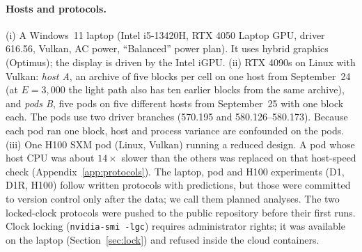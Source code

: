 \paragraph{Hosts and protocols.} (i) A Windows~11 laptop (Intel i5-13420H, RTX 4050 Laptop GPU, driver 616.56, Vulkan, AC power, ``Balanced'' power plan). It uses hybrid graphics (Optimus); the display is driven by the Intel iGPU. (ii) RTX 4090s on Linux with Vulkan: \emph{host A}, an archive of five blocks per cell on one host from September~24 (at $E=3{,}000$ the light path also has ten earlier blocks from the same archive), and \emph{pods B}, five pods on five different hosts from September~25 with one block each. The pods use two driver branches (570.195 and 580.126--580.173). Because each pod ran one block, host and process variance are confounded on the pods. (iii) One H100 SXM pod (Linux, Vulkan) running a reduced design. A pod whose host CPU was about $14\times$ slower than the others was replaced on that host-speed check (Appendix~\ref{app:protocols}). The laptop, pod and H100 experiments (D1, D1R, H100) follow written protocols with predictions, but those were committed to version control only after the data; we call them planned analyses. The two locked-clock protocols were pushed to the public repository before their first runs. Clock locking (\texttt{nvidia-smi -lgc}) requires administrator rights; it was available on the laptop (Section~\ref{sec:lock}) and refused inside the cloud containers.

